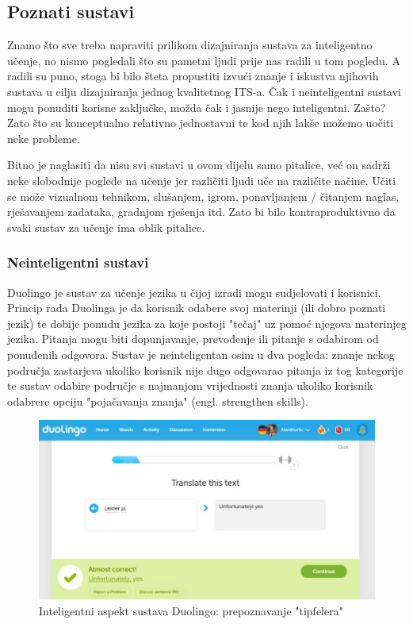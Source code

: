 \documentclass[times, utf8, zavrsni]{fer}
\begin{document}
\subsection{Poznati sustavi}

Znamo što sve treba napraviti prilikom dizajniranja sustava za inteligentno učenje, no nismo pogledali što su pametni ljudi prije nas radili u tom pogledu. A radili su puno, stoga bi bilo šteta propustiti izvući znanje i iskustva njihovih sustava u cilju dizajniranja jednog kvalitetnog ITS-a. Čak i neinteligentni sustavi mogu ponuditi korisne zaključke, možda čak i jasnije nego inteligentni. Zašto? Zato što su konceptualno relativno jednostavni te kod njih lakše možemo uočiti neke probleme.
\par
Bitno je naglasiti da nisu svi sustavi u ovom dijelu samo pitalice, već on sadrži neke slobodnije poglede na učenje jer različiti ljudi uče na različite načine. Učiti se može vizualnom tehnikom, slušanjem, igrom, ponavljanjem / čitanjem naglas, rješavanjem zadataka, gradnjom rješenja itd. Zato bi bilo kontraproduktivno da svaki sustav za učenje ima oblik pitalice.

\subsubsection{Neinteligentni sustavi}

Duolingo je sustav za učenje jezika u čijoj izradi mogu sudjelovati i korisnici. Princip rada Duolinga je da korisnik odabere svoj materinji (ili dobro poznati jezik) te dobije ponudu jezika za koje postoji "tečaj" uz pomoć njegova materinjeg jezika. Pitanja mogu biti dopunjavanje, prevođenje ili pitanje s odabirom od ponuđenih odgovora. Sustav je neinteligentan osim u dva pogleda: znanje nekog područja zastarjeva ukoliko korisnik nije dugo odgovarao pitanja iz tog kategorije te sustav odabire područje s najmanjom vrijednosti znanja ukoliko korisnik odabrere opciju "pojačavanja znanja" (engl. strengthen skills).

\begin{figure}[htb]
	\centering
	\includegraphics[]{img/duolingo.jpg}
	\caption{Inteligentni aspekt sustava Duolingo: prepoznavanje "tipfelera"}
	\label{fig:duolingo}
\end{figure}
\end{document}
